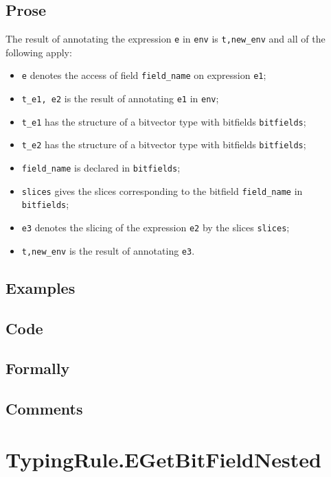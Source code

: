 \documentclass{book}
\begin{document}
  \subsection{Prose}
  The result of annotating the expression \texttt{e} in \texttt{env} is
\texttt{t,new\_env} and all of the following apply:
  \begin{itemize}
  \item \texttt{e} denotes the access of field \texttt{field\_name} on expression \texttt{e1};
  \item \texttt{t\_e1, e2} is the result of annotating \texttt{e1} in \texttt{env};
  \item \texttt{t\_e1} has the structure of a bitvector type with bitfields \texttt{bitfields};
  \item \texttt{t\_e2} has the structure of a bitvector type with bitfields \texttt{bitfields};
  \item \texttt{field\_name} is declared in \texttt{bitfields};
  \item \texttt{slices} gives the slices corresponding to the bitfield \texttt{field\_name}
    in \texttt{bitfields};
  \item \texttt{e3} denotes the slicing of the expression \texttt{e2} by the slices \texttt{slices};
  \item \texttt{t,new\_env} is the result of annotating \texttt{e3}.
  \end{itemize}

  \subsection{Examples}

  \subsection{Code}

  \subsection{Formally}

  \subsection{Comments}

\section{TypingRule.EGetBitFieldNested \label{sec:TypingRule.EGetBitFieldNested}}
\end{document}
